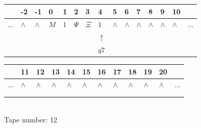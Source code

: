 \documentclass[11pt]{article}
\begin{document}
\begin{table}[H]
\centering
\begin{tabular}{lllllllllllllll}
 & -2 & -1 & 0 & 1 & 2 & 3 & 4 & 5 & 6 & 7 & 8 & 9 & 10 & \\
\hline
$...$ & \multicolumn{1}{|l|}{$\wedge$} & \multicolumn{1}{|l|}{$\wedge$} & \multicolumn{1}{|l|}{$M$} & \multicolumn{1}{|l|}{$1$} & \multicolumn{1}{|l|}{$\Psi$} & \multicolumn{1}{|l|}{$\Xi$} & \multicolumn{1}{|l|}{$1$} & \multicolumn{1}{|l|}{$\wedge$} & \multicolumn{1}{|l|}{$\wedge$} & \multicolumn{1}{|l|}{$\wedge$} & \multicolumn{1}{|l|}{$\wedge$} & \multicolumn{1}{|l|}{$\wedge$} & \multicolumn{1}{|l|}{$\wedge$} & $...$\\
\hline
&  &  &  &  &  &  & $\uparrow$ &  &  &  &  &  &  &  \\
&  &  &  &  &  &  & $ q7 $ &  &  &  &  &  &  &  \\
\end{tabular}
\begin{tabular}{llllllllllll}
 & 11 & 12 & 13 & 14 & 15 & 16 & 17 & 18 & 19 & 20 & \\
\hline
$...$ & \multicolumn{1}{|l|}{$\wedge$} & \multicolumn{1}{|l|}{$\wedge$} & \multicolumn{1}{|l|}{$\wedge$} & \multicolumn{1}{|l|}{$\wedge$} & \multicolumn{1}{|l|}{$\wedge$} & \multicolumn{1}{|l|}{$\wedge$} & \multicolumn{1}{|l|}{$\wedge$} & \multicolumn{1}{|l|}{$\wedge$} & \multicolumn{1}{|l|}{$\wedge$} & \multicolumn{1}{|l|}{$\wedge$} & $...$\\
\hline
&  &  &  &  &  &  &  &  &  &  &  \\
&  &  &  &  &  &  &  &  &  &  &  \\
\end{tabular}
\\
Tape number: 12
\noindent\makebox[\linewidth]{\hdashrule{\textwidth}{1pt}{1pt}}\end{table}
\end{document}
